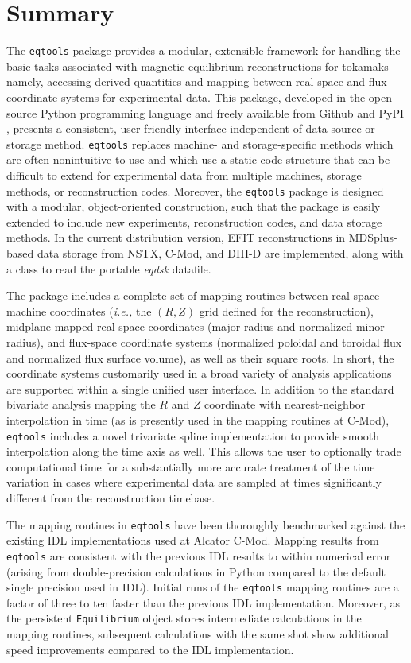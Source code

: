 \documentclass[12pt,floatfix,showpacs]{revtex4-1}
\newcommand{\ie}{\emph{i.e., }}
\newcommand{\eqtools}{\texttt{eqtools}\xspace}
\begin{document}
\section{Summary}\label{sec:summary}

The \eqtools package provides a modular, extensible framework for handling the basic tasks associated with magnetic equilibrium reconstructions for tokamaks -- namely, accessing derived quantities and mapping between real-space and flux coordinate systems for experimental data.
This package, developed in the open-source Python programming language and freely available from Github and PyPI \cite{eqtools_pypi,*eqtools_git,*eqtools_readthedocs}, presents a consistent, user-friendly interface independent of data source or storage method.
\eqtools replaces machine- and storage-specific methods which are often nonintuitive to use and which use a static code structure that can be difficult to extend for experimental data from multiple machines, storage methods, or reconstruction codes.
Moreover, the \eqtools package is designed with a modular, object-oriented construction, such that the package is easily extended to include new experiments, reconstruction codes, and data storage methods.
In the current distribution version, EFIT reconstructions \cite{Lao1985} in MDSplus-based data storage from NSTX, C-Mod, and DIII-D are implemented, along with a class to read the portable \emph{eqdsk} datafile.  

The package includes a complete set of mapping routines between real-space machine coordinates (\ie the $(R, Z)$ grid defined for the reconstruction), midplane-mapped real-space coordinates (major radius and normalized minor radius), and flux-space coordinate systems (normalized poloidal and toroidal flux and normalized flux surface volume), as well as their square roots.
In short, the coordinate systems customarily used in a broad variety of analysis applications are supported within a single unified user interface.  
In addition to the standard bivariate analysis mapping the $R$ and $Z$ coordinate with nearest-neighbor interpolation in time (as is presently used in the mapping routines at C-Mod), \eqtools includes a novel trivariate spline implementation to provide smooth interpolation along the time axis as well.  
This allows the user to optionally trade computational time for a substantially more accurate treatment of the time variation in cases where experimental data are sampled at times significantly different from the reconstruction timebase.

The mapping routines in \eqtools have been thoroughly benchmarked against the existing IDL implementations used at Alcator C-Mod.  
Mapping results from \eqtools are consistent with the previous IDL results to within numerical error (arising from double-precision calculations in Python compared to the default single precision used in IDL).
Initial runs of the \eqtools mapping routines are a factor of three to ten faster than the previous IDL implementation.
Moreover, as the persistent \verb|Equilibrium| object stores intermediate calculations in the mapping routines, subsequent calculations with the same shot show additional speed improvements compared to the IDL implementation.
\end{document}
